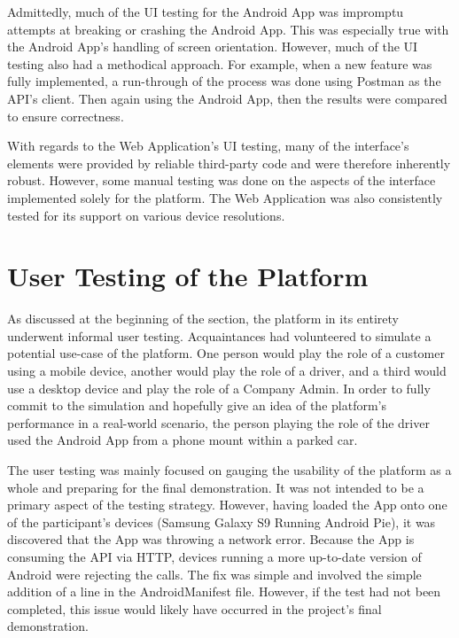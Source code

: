 Admittedly, much of the UI testing for the Android App was impromptu attempts at breaking or crashing the Android App. This was especially true with the Android App's handling of screen orientation. However, much of the UI testing also had a methodical approach. For example, when a new feature was fully implemented, a run-through of the process was done using Postman as the API's client. Then again using the Android App, then the results were compared to ensure correctness.

With regards to the Web Application's UI testing, many of the interface's elements were provided by reliable third-party code and were therefore inherently robust. However, some manual testing was done on the aspects of the interface implemented solely for the platform. The Web Application was also consistently tested for its support on various device resolutions.

\section{User Testing of the Platform}
As discussed at the beginning of the section, the platform in its entirety underwent informal user testing. Acquaintances had volunteered to simulate a potential use-case of the platform. One person would play the role of a customer using a mobile device, another would play the role of a driver, and a third would use a desktop device and play the role of a Company Admin. In order to fully commit to the simulation and hopefully give an idea of the platform's performance in a real-world scenario, the person playing the role of the driver used the Android App from a phone mount within a parked car.

The user testing was mainly focused on gauging the usability of the platform as a whole and preparing for the final demonstration. It was not intended to be a primary aspect of the testing strategy. However, having loaded the App onto one of the participant's devices (Samsung Galaxy S9 Running Android Pie), it was discovered that the App was throwing a network error. Because the App is consuming the API via HTTP, devices running a more up-to-date version of Android were rejecting the calls. The fix was simple and involved the simple addition of a line in the AndroidManifest file. However, if the test had not been completed, this issue would likely have occurred in the project's final demonstration.

